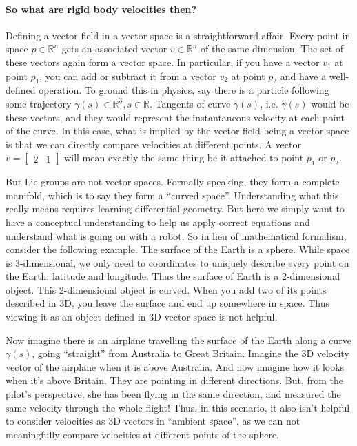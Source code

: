 \paragraph{So what are rigid body velocities then?}
Defining a vector field in a vector space is a straightforward affair.
Every point in space $ p \in \mathbb{R}^{n}  $ gets an associated vector 
$ v \in \mathbb{R}^{n}  $ of the same dimension.
The set of these vectors again form a vector space.
In particular, if you have a vector $ v_{ 1 }  $ at point $ p_{ 1 }  $,
you can add or subtract it from a vector $ v_{ 2 }  $ at point $ p_{ 2 }  $
and have a well-defined operation.
To ground this in physics, say there is a particle following some trajectory
$ \gamma (s) \in \mathbb{R}^{ 3 }, s \in \mathbb{R}  $.
Tangents of curve $ \gamma (s)  $, i.e. $ \dot{\gamma} (s)  $ would be these vectors,
and they would represent the instantaneous velocity at each point of the curve.
In this case, what is implied by the vector field being a vector space is that
we can directly compare velocities at different points. A vector 
$ v = \begin{bmatrix} 2 & 1 \end{bmatrix}   $ will mean exactly the same
thing be it attached to point $ p_{ 1 }  $ or $ p_{ 2 }  $.

But Lie groups are not vector spaces. Formally speaking, they form a complete
manifold, which is to say they form a ``curved space''. 
Understanding what this really means requires learning differential geometry.
But here we simply want to have a conceptual understanding to help
us apply correct equations and understand what is going on with a robot.
So in lieu of mathematical formalism, consider the following example.
The surface of the Earth is a sphere. While space is 3-dimensional,
we only need to coordinates to uniquely describe every point on the Earth:
latitude and longitude. Thus the surface of Earth is a 2-dimensional object.
This 2-dimensional object is curved. When you add two of its points described in 3D,
you leave the surface and end up somewhere in space.
Thus viewing it as an object defined in 3D vector space is not helpful.

Now imagine there is an airplane travelling the surface of the Earth along a curve $ \gamma(s)  $,
going ``straight'' from Australia to Great Britain.
Imagine the 3D velocity vector of the airplane when it is above Australia.
And now imagine how it looks when it's above Britain.
They are pointing in different directions. But, from the pilot's perspective,
she has been flying in the same direction, and measured the same velocity
through the whole flight!
Thus, in this scenario, it also isn't helpful to consider velocities 
as 3D vectors in ``ambient space'', as we can not meaningfully compare
velocities at different points of the sphere.


